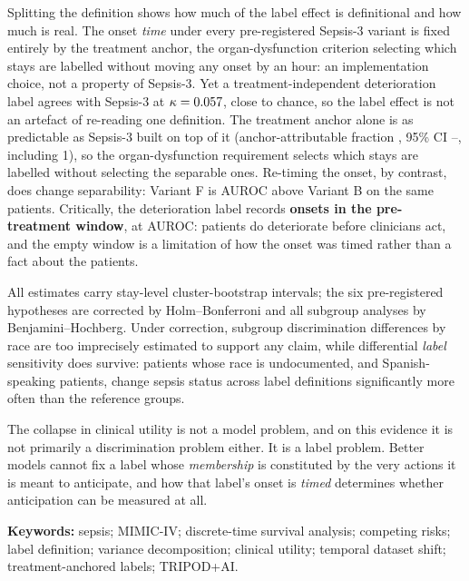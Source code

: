 Splitting the definition shows how much of the label effect is definitional and
how much is real. The onset \emph{time} under every pre-registered Sepsis-3
variant is fixed entirely by the treatment anchor, the organ-dysfunction
criterion selecting which stays are labelled without moving any onset by an
hour: an implementation choice, not a property of Sepsis-3. Yet a
treatment-independent deterioration label agrees with Sepsis-3 at
$\kappa = 0.057$, close to chance, so the label effect is not an artefact
of re-reading one definition. The treatment anchor alone is as predictable as
Sepsis-3 built on top of it (anchor-attributable fraction
\pcPhiAnchorPrimary, 95\% CI \pcPhiAnchorCiLoPrimary--\pcPhiAnchorCiHiPrimary,
including 1), so the organ-dysfunction requirement selects which stays are
labelled without selecting the separable ones. Re-timing the onset, by contrast,
does change separability: Variant F is \pcAltDeltaPrimaryF{} AUROC above
Variant B on the same patients. Critically, the deterioration label records
\textbf{\pcPreTreatOnsetsVarD{}
onsets in the pre-treatment window}, at \pcPreTreatAurocPrimaryD{} AUROC:
patients do deteriorate before clinicians act, and the empty window is a
limitation of how the onset was timed rather than a fact about the patients.

All estimates carry stay-level cluster-bootstrap intervals; the six
pre-registered hypotheses are corrected by Holm--Bonferroni and all subgroup
analyses by Benjamini--Hochberg. Under correction, subgroup discrimination
differences by race are too imprecisely estimated to support any claim, while
differential \emph{label} sensitivity does survive: patients whose race is
undocumented, and Spanish-speaking patients, change sepsis status across label
definitions significantly more often than the reference groups.

The collapse in clinical utility is not a model problem, and on this evidence it
is not primarily a discrimination problem either. It is a label problem. Better
models cannot fix a label whose \emph{membership} is constituted by the very
actions it is meant to anticipate, and how that label's onset is
\emph{timed} determines whether anticipation can be measured at all.

\noindent\textbf{Keywords:} sepsis; MIMIC-IV; discrete-time survival analysis;
competing risks; label definition; variance decomposition; clinical utility;
temporal dataset shift; treatment-anchored labels; TRIPOD+AI.
